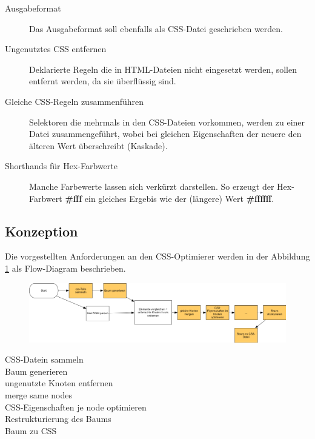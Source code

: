 \begin{description}
    \item[Ausgabeformat] Das Ausgabeformat soll ebenfalls als CSS-Datei geschrieben werden.
    
    \item[Ungenutztes CSS entfernen] Deklarierte Regeln die in HTML-Dateien nicht eingesetzt werden, sollen entfernt werden, da sie überflüssig sind.
    
    \item[Gleiche CSS-Regeln zusammenführen] Selektoren die mehrmals in den CSS-Dateien vorkommen, werden zu einer Datei zusammengeführt, wobei bei gleichen Eigenschaften der neuere den älteren Wert überschreibt (Kaskade).
    
    \item[Shorthands für Hex-Farbwerte] Manche Farbewerte lassen sich verkürzt darstellen. So erzeugt der Hex-Farbwert \textbf{\#fff} ein gleiches Ergebis wie der (längere) Wert \textbf{\#ffffff}. 
    
    \item[]
\end{description}

\subsection{Konzeption}

Die vorgestellten Anforderungen an den CSS-Optimierer werden in der Abbildung \ref{app-workflow} als Flow-Diagram beschrieben. 
 
\begin{figure}[h!]
\includegraphics[width=1.0\textwidth]{img/app-workflow.png}
\label{app-workflow}
\end{figure}

\begin{description}
    \item[CSS-Datein sammeln]

    \item[Baum generieren]
    
    \item[ungenutzte Knoten entfernen]
    
    \item[merge same nodes]
    
    \item[CSS-Eigenschaften je node optimieren]
    
    \item[Restrukturierung des Baums]
    
    \item[Baum zu CSS]    
\end{description}

